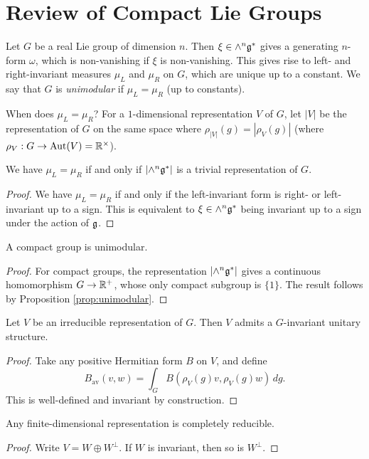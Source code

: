 \section{Review of Compact Lie Groups}

\begin{remark}
  Let $G$ be a real Lie group of
  dimension $n$. Then $\xi \in \wedge^n \mathfrak{g}^*$
  gives a generating $n$-form $\omega$,
  which is non-vanishing if $\xi$
  is non-vanishing. This gives
  rise to left- and right-invariant
  measures $\mu_L$ and $\mu_R$
  on $G$, which are
  unique up to a constant.
  We say that $G$ is \emph{unimodular}
  if $\mu_L = \mu_R$ (up to constants).

  When does $\mu_L = \mu_R$?
  For a $1$-dimensional
  representation $V$ of $G$, let $|V|$
  be the representation of $G$ on
  the same space where
  $\rho_{|V|}(g) = |\rho_V(g)|$
  (where $\rho_V : G \to \operatorname{Aut}(V) = \mathbb{R}^\times$).
\end{remark}

\begin{prop}\label{prop:unimodular}
  We have $\mu_L = \mu_R$ if and only
  if $|{\wedge^n \mathfrak{g}^*}|$ is a trivial
  representation of $G$.
\end{prop}

\begin{proof}
  We have $\mu_L = \mu_R$ if and only
  if the left-invariant form is right-
  or left-invariant
  up to a sign. This is equivalent
  to $\xi \in \wedge^n \mathfrak{g}^*$
  being invariant up to a sign under the
  action of $\mathfrak{g}$.
\end{proof}

\begin{prop}
  A compact group is unimodular.
\end{prop}

\begin{proof}
  For compact groups,
  the representation
  $|{\wedge^n \mathfrak{g}^*}|$
  gives a continuous homomorphism
  $G \to \mathbb{R}^+$, whose
  only compact subgroup is
  $\{1\}$. The result follows by
  Proposition \ref{prop:unimodular}.
\end{proof}

\begin{prop}
  Let $V$ be an irreducible
  representation of $G$. Then
  $V$ admits a $G$-invariant
  unitary structure.
\end{prop}

\begin{proof}
  Take any positive Hermitian form
  $B$ on $V$, and define
  \[
    B_{\mathrm{av}}(v, w)
    = \int_G B(\rho_V(g) v, \rho_V(g) w)\, dg.
  \]
  This is well-defined and
  invariant by construction.
\end{proof}

\begin{corollary}
  Any finite-dimensional
  representation is completely
  reducible.
\end{corollary}

\begin{proof}
  Write $V = W \oplus W^\perp$.
  If $W$ is invariant, then so
  is $W^\perp$.
\end{proof}
